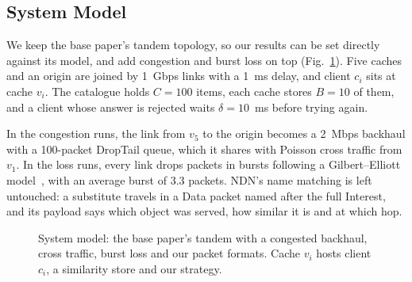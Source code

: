 \documentclass[11pt,a4paper]{article}
\newcommand{\code}[1]{\texttt{#1}}
\begin{document}
\subsection{System Model}\label{sec:system}
We keep the base paper's tandem topology, so our results can be set directly against its model, and
add congestion and burst loss on top (Fig.~\ref{fig:system}). Five caches and an origin are joined by
1~Gbps links with a 1~ms delay, and client $c_i$ sits at cache $v_i$. The catalogue holds $C=100$
items, each cache stores $B=10$ of them, and a client whose answer is rejected waits $\delta=10$~ms
before trying again.

In the congestion runs, the link from $v_5$ to the origin becomes a 2~Mbps backhaul with a 100-packet
DropTail queue, which it shares with Poisson cross traffic from $v_1$. In the loss runs, every link
drops packets in bursts following a Gilbert--Elliott
model~\cite{gilbert1960capacity,elliott1963estimates}, with an average burst of 3.3 packets. NDN's
name matching is left untouched: a substitute travels in a Data packet named after the full Interest,
and its payload says which object was served, how similar it is and at which hop.

\begin{figure}[H]
\centering
{}
\caption{System model: the base paper's tandem with a congested backhaul, cross traffic, burst loss
and our packet formats. Cache $v_i$ hosts client $c_i$, a similarity store and our strategy.}
\label{fig:system}
\end{figure}
\end{document}
